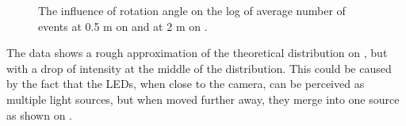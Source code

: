 \begin{figure}[H]
	\centering
	\caption{
  The influence of rotation angle on the log of average number of events at 0.5 m on  and at 2 m on .
  }
	\label{fig:angles}
\end{figure}
The data shows a rough approximation of the theoretical distribution on ,
but with a drop of intensity at the middle of the distribution. This could be caused
by the fact that the LEDs, when close to the camera, can be perceived as multiple light sources,
but when moved further away, they merge into one source as shown on .

